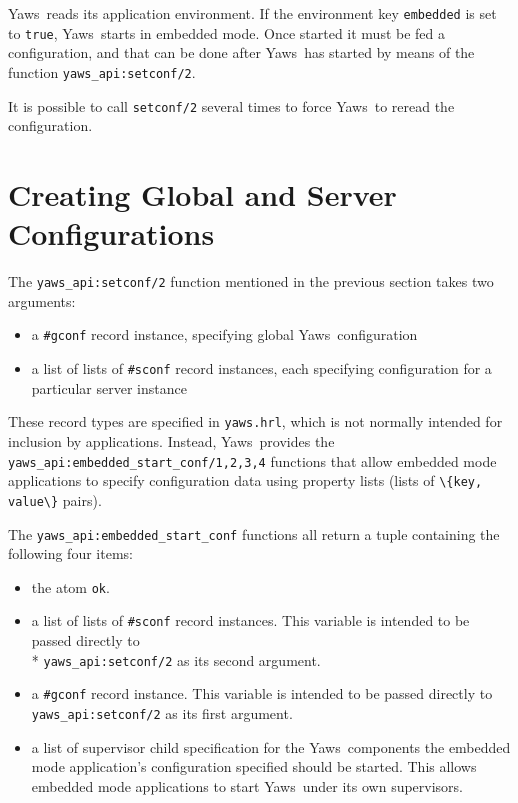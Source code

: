 \documentclass[11pt,oneside,english]{book}
\newcommand{\Yaws}            %
        {{\sc Yaws}}
\begin{document}
\Yaws\  reads its application environment. If the environment key
\verb+embedded+ is set to \verb+true+, \Yaws\  starts in embedded mode.
Once started it must be fed a configuration, and that can be done
after \Yaws\  has started by means of the function
\verb+yaws_api:setconf/2+.

It is possible to call \verb+setconf/2+ several times to force \Yaws\  to
reread the configuration.

\section{Creating Global and Server Configurations}

The \verb+yaws_api:setconf/2+ function mentioned in the previous
section takes two arguments:

\begin{itemize}

\item a \verb+#gconf+ record instance, specifying global
  \Yaws\  configuration

\item a list of lists of \verb+#sconf+ record instances, each
  specifying configuration for a particular server instance

\end{itemize}

These record types are specified in \verb+yaws.hrl+, which is not
normally intended for inclusion by applications. Instead,
\Yaws\  provides the \verb+yaws_api:embedded_start_conf/1,2,3,4+
functions that allow embedded mode applications to specify
configuration data using property lists (lists of
\verb+\{key, value\}+ pairs).

The \verb+yaws_api:embedded_start_conf+ functions all return a tuple
containing the following four items:

\begin{itemize}

\item the atom \verb+ok+.

\item a list of lists of \verb+#sconf+ record instances. This variable
  is intended to be passed directly to\\* \verb+yaws_api:setconf/2+ as
  its second argument.

\item a \verb+#gconf+ record instance. This variable is intended to
  be passed directly to \verb+yaws_api:setconf/2+ as its first
  argument.

\item a list of supervisor child specification for the
  \Yaws\  components the embedded mode application's configuration
  specified should be started. This allows embedded mode applications
  to start \Yaws\  under its own supervisors.

\end{itemize}
\end{document}
